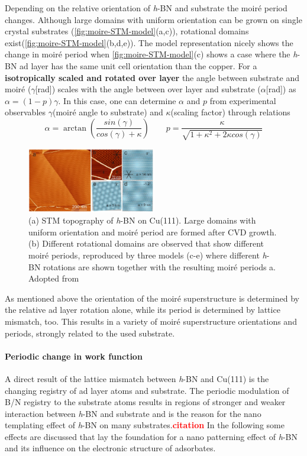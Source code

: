 Depending on the relative orientation of \textit{h}-BN and substrate the moir\'e period changes. Although large domains with uniform orientation can be grown on single crystal substrates (\autoref{fig:moire-STM-model}(a,c)), rotational domains exist(\autoref{fig:moire-STM-model}(b,d,e)).
The model representation nicely shows the change in moir\'e period when
\autoref{fig:moire-STM-model}(c) shows a case where the \textit{h}-BN ad layer has the same unit cell orientation than the copper. For a \textbf{isotropically scaled and rotated over layer} the angle between substrate and moir\'e ($\gamma$[rad]) scales with the angle between over layer and substrate ($\alpha$[rad]) as $\alpha=(1-p)\gamma$.
In this case, one can determine $\alpha$ and $p$ from experimental observables $\gamma$(moir\'e angle to substrate) and $\kappa$(scaling factor) through relations $$ \alpha=\arctan \left ( \frac{sin(\gamma)}{cos(\gamma)+\kappa} \right )\qquad p=\frac{\kappa}{\sqrt{1+\kappa^2+2\kappa cos(\gamma)}}$$

\begin{figure} \centering
	\includegraphics[width=0.5\textwidth]{./images/h-BN-cvd-cu111.png}%
\caption{(a) STM topography of \textit{h}-BN on Cu(111). Large domains with uniform orientation and moir\'e period are formed after CVD growth. (b) Different rotational domains are observed that show different moir\'e periods, reproduced by three models (c-e) where different \textit{h}-BN rotations are shown together with the resulting moir\'e periods a. Adopted from \cite{joshi_boron_2012}}
\label{fig:moire-STM-model}
\end{figure}

As mentioned above the orientation of the moir\'e superstructure is determined by the relative ad layer rotation alone, while its period is determined by lattice mismatch, too. This results in a variety of moir\'e superstructure orientations and periods, strongly related to the used substrate.
	
\paragraph{Periodic change in work function}
A direct result of the lattice mismatch between \textit{h}-BN and Cu(111) is the changing registry of ad layer atoms and substrate. The periodic modulation of B/N registry to the substrate atoms results in regions of stronger and weaker interaction between \textit{h}-BN and substrate and is the reason for the nano templating effect of \textit{h}-BN on many substrates.\textcolor{red}{\textbf{citation}} In the following some effects are discussed that lay the foundation for a nano patterning effect of \textit{h}-BN and its influence on the electronic structure of adsorbates.

